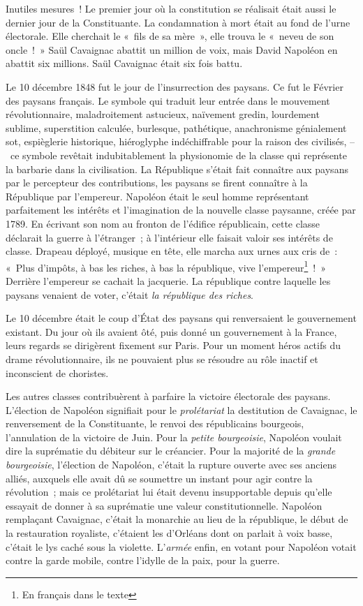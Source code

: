 \documentclass[twoside]{book} %
\begin{document}
Inutiles mesures ! Le premier jour où la constitution se réalisait était aussi le dernier jour de la Constituante. La condamnation à mort était au fond de l’urne électorale. Elle cherchait le « fils de sa mère », elle trouva le « neveu de son oncle ! » Saül Cavaignac abattit un million de voix, mais David Napoléon en abattit six millions. Saül Cavaignac était six fois battu.\par
Le 10 décembre 1848 fut le jour de l’insurrection des paysans. Ce fut le Février des paysans français. Le symbole qui traduit leur entrée dans le mouvement révolutionnaire, maladroitement astucieux, naïvement gredin, lourdement sublime, superstition calculée, burlesque, pathétique, anachronisme génialement sot, espièglerie historique, hiéroglyphe indéchiffrable pour la raison des civilisés, – ce symbole revêtait indubitablement la physionomie de la classe qui représente la barbarie dans la civilisation. La République s’était fait connaître aux paysans par le percepteur des contributions, les paysans se firent connaître à la République par l’empereur. Napoléon était le seul homme représentant parfaitement les intérêts et l’imagination de la nouvelle classe paysanne, créée par 1789. En écrivant son nom au fronton de l’édifice républicain, cette classe déclarait la guerre à l’étranger ; à l’intérieur elle faisait valoir ses intérêts de classe. Drapeau déployé, musique en tête, elle marcha aux urnes aux cris de : « Plus d’impôts, à bas les riches, à bas la république, vive l’empereur\footnote{En français dans le texte} ! » Derrière l’empereur se cachait la jacquerie. La république contre laquelle les paysans venaient de voter, c’était \emph{la république des riches}.\par
Le 10 décembre était le coup d’État des paysans qui renversaient le gouvernement existant. Du jour où ils avaient ôté, puis donné un gouvernement à la France, leurs regards se dirigèrent fixement sur Paris. Pour un moment héros actifs du drame révolutionnaire, ils ne pouvaient plus se résoudre au rôle inactif et inconscient de choristes.\par
Les autres classes contribuèrent à parfaire la victoire électorale des paysans. L’élection de Napoléon signifiait pour le \emph{prolétariat} la destitution de Cavaignac, le renversement de la Constituante, le renvoi des républicains bourgeois, l’annulation de la victoire de Juin. Pour la \emph{petite bourgeoisie}, Napoléon voulait dire la suprématie du débiteur sur le créancier. Pour la majorité de la \emph{grande bourgeoisie}, l’élection de Napoléon, c’était la rupture ouverte avec ses anciens alliés, auxquels elle avait dû se soumettre un instant pour agir contre la révolution ; mais ce prolétariat lui était devenu insupportable depuis qu’elle essayait de donner à sa suprématie une valeur constitutionnelle. Napoléon remplaçant Cavaignac, c’était la monarchie au lieu de la république, le début de la restauration royaliste, c’étaient les d’Orléans dont on parlait à voix basse, c’était le lys caché sous la violette. L’\emph{armée} enfin, en votant pour Napoléon votait contre la garde mobile, contre l’idylle de la paix, pour la guerre.\par
\end{document}

